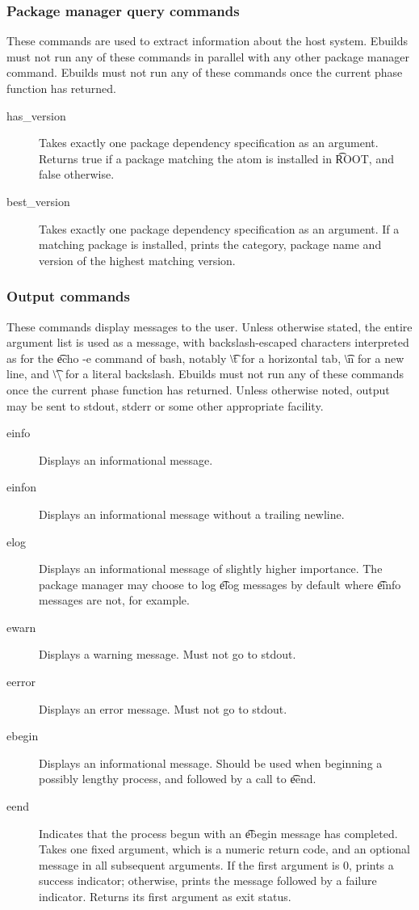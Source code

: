 \subsubsection{Package manager query commands}
These commands are used to extract information about the host system. Ebuilds must not run any of
these commands in parallel with any other package manager command. Ebuilds must not run any of
these commands once the current phase function has returned.
\begin{description}
\item[has\_version] Takes exactly one package dependency specification as an argument. Returns
    true if a package matching the atom is installed in \t{ROOT}, and false otherwise.
\item[best\_version] Takes exactly one package dependency specification as an argument. If a
    matching package is installed, prints the category, package name and version of the highest
    matching version.
\end{description}

\subsubsection{Output commands}
These commands display messages to the user. Unless otherwise stated, the entire argument list is
used as a message, with backslash-escaped characters interpreted as for the \t{echo -e} command of
bash, notably \t{\textbackslash t} for a horizontal tab, \t{\textbackslash n} for a new line, and
\t{\textbackslash\textbackslash} for a literal backslash. Ebuilds must not run any of these commands
once the current phase function has returned. Unless otherwise noted, output may be sent to stdout,
stderr or some other appropriate facility.
\begin{description}
\item[einfo] Displays an informational message.
\item[einfon] Displays an informational message without a trailing newline.
\item[elog] Displays an informational message of slightly higher importance. The package
    manager may choose to log \t{elog} messages by default where \t{einfo} messages are not, for
    example.
\item[ewarn] Displays a warning message. Must not go to stdout.
\item[eerror] Displays an error message. Must not go to stdout.
\item[ebegin] Displays an informational message. Should be used when beginning a possibly
    lengthy process, and followed by a call to \t{eend}.
\item[eend] Indicates that the process begun with an \t{ebegin} message has completed. Takes one
    fixed argument, which is a numeric return code, and an optional message in all subsequent
    arguments. If the first argument is 0, prints a success indicator; otherwise, prints the
    message followed by a failure indicator. Returns its first argument as exit status.
\end{description}

